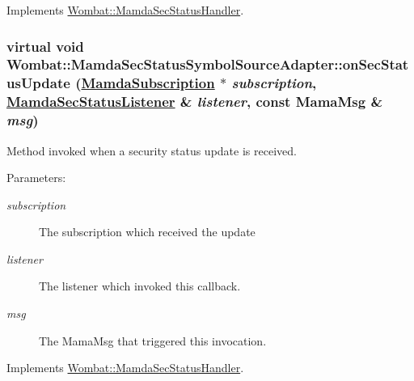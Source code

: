 Implements \hyperlink{classWombat_1_1MamdaSecStatusHandler_7f49ada42883a664440776560fd6f083}{Wombat::Mamda\-Sec\-Status\-Handler}.\hypertarget{classWombat_1_1MamdaSecStatusSymbolSourceAdapter_4671f467c1425728565861501e610ba3}{
\subsubsection[onSecStatusUpdate]{\setlength{\rightskip}{0pt plus 5cm}virtual void Wombat::Mamda\-Sec\-Status\-Symbol\-Source\-Adapter::on\-Sec\-Status\-Update (\hyperlink{classWombat_1_1MamdaSubscription}{Mamda\-Subscription} $\ast$ {\em subscription}, \hyperlink{classWombat_1_1MamdaSecStatusListener}{Mamda\-Sec\-Status\-Listener} \& {\em listener}, const Mama\-Msg \& {\em msg})}}
\label{classWombat_1_1MamdaSecStatusSymbolSourceAdapter_4671f467c1425728565861501e610ba3}


Method invoked when a security status update is received. 

\begin{Desc}
\item[Parameters:]
\begin{description}
\item[{\em subscription}]The subscription which received the update \item[{\em listener}]The listener which invoked this callback. \item[{\em msg}]The Mama\-Msg that triggered this invocation. \end{description}
\end{Desc}


Implements \hyperlink{classWombat_1_1MamdaSecStatusHandler_db36d5defe6bca39835cca9c9732bef2}{Wombat::Mamda\-Sec\-Status\-Handler}.
